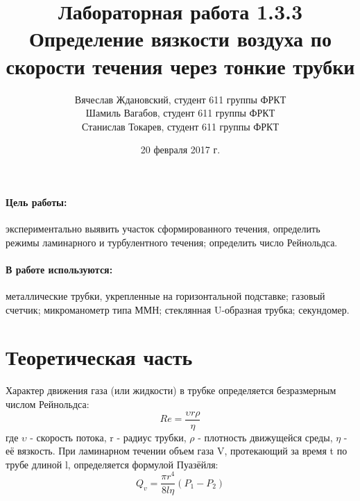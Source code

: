 \documentclass[a4paper]{article}
\title{Лабораторная работа 1.3.3 \\Определение вязкости воздуха по скорости течения через тонкие трубки}
\date{20 февраля 2017 г.}
\author{Вячеслав Ждановский, студент 611 группы ФРКТ\\
Шамиль Вагабов, студент 611 группы ФРКТ\\
Станислав Токарев, студент 611 группы ФРКТ}
\begin{document}
	\maketitle
	\newpage
	\paragraph{Цель работы:}
	экспериментально выявить участок сформированного течения, определить режимы ламинарного и турбулентного течения; определить число Рейнольдса.
	\paragraph{В работе используются:}
	металлические трубки, укрепленные на горизонтальной подставке; газовый счетчик; микроманометр типа ММН; стеклянная U-образная трубка; секундомер.
	\section{Теоретическая часть}
	Характер движения газа (или жидкости) в трубке определяется безразмерным числом Рейнольдса:
	\begin{equation}
	Re=\frac{\upsilon r\rho}{\eta}
	\end{equation}
	где $\upsilon$ - скорость потока, r - радиус трубки, $\rho$ - плотность движущейся среды, $\eta$ - её вязкость.
	При ламинарном течении объем газа V, протекающий за время t по трубе длиной l, определяется формулой Пуазёйля:
	\begin{equation}
	Q_v=\frac{\pi r^4}{8l\eta}(P_1-P_2)
	\end{equation}
\end{document}
